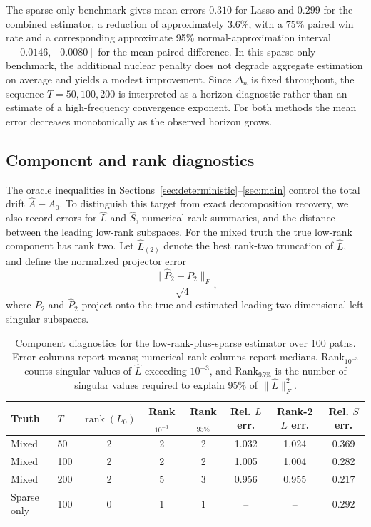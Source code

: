 \documentclass[12pt]{article}
\theoremstyle{definition}
\begin{document}
	The sparse-only benchmark gives mean errors $0.310$ for Lasso and $0.299$ for the combined estimator, a reduction of approximately $3.6\%$, with a $75\%$ paired win rate and a corresponding approximate 95\% normal-approximation interval $[-0.0146,-0.0080]$ for the mean paired difference. In this sparse-only benchmark, the additional nuclear penalty does not degrade aggregate estimation on average and yields a modest improvement. Since $\Delta_n$ is fixed throughout, the sequence $T=50,100,200$ is interpreted as a horizon diagnostic rather than an estimate of a high-frequency convergence exponent. For both methods the mean error decreases monotonically as the observed horizon grows.
	
	\subsection{Component and rank diagnostics}
	
	The oracle inequalities in Sections~\ref{sec:deterministic}--\ref{sec:main} control the total drift $\widehat A-A_0$. To distinguish this target from exact decomposition recovery, we also record errors for $\widehat L$ and $\widehat S$, numerical-rank summaries, and the distance between the leading low-rank subspaces. For the mixed truth the true low-rank component has rank two. Let $\widehat L_{(2)}$ denote the best rank-two truncation of $\widehat L$, and define the normalized projector error
	\[
	\frac{\|\widehat P_2-P_2\|_F}{\sqrt{4}},
	\]
	where $P_2$ and $\widehat P_2$ project onto the true and estimated leading two-dimensional left singular subspaces.
	
	\begin{table}[ht]
		\centering
		\caption{Component diagnostics for the low-rank-plus-sparse estimator over 100 paths. Error columns report means; numerical-rank columns report medians. Rank$_{10^{-3}}$ counts singular values of $\widehat L$ exceeding $10^{-3}$, and Rank$_{95\%}$ is the number of singular values required to explain 95\% of $\|\widehat L\|_F^2$.}
		\label{tab:component_diagnostics}
		\small
		\begin{tabular}{llcccccc}
			\toprule
			Truth & $T$ & $\operatorname{rank}(L_0)$ & Rank$_{10^{-3}}$ & Rank$_{95\%}$
			& Rel. $L$ err. & Rank-2 $L$ err. & Rel. $S$ err. \\
			\midrule
			Mixed & 50 & 2 & 2 & 2 & 1.032 & 1.024 & 0.369 \\
			Mixed & 100 & 2 & 2 & 2 & 1.005 & 1.004 & 0.282 \\
			Mixed & 200 & 2 & 5 & 3 & 0.956 & 0.955 & 0.217 \\
			Sparse only & 100 & 0 & 1 & 1 & -- & -- & 0.292 \\
			\bottomrule
		\end{tabular}
	\end{table}
	
\end{document}
